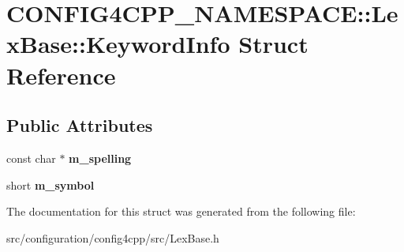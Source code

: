 \hypertarget{structCONFIG4CPP__NAMESPACE_1_1LexBase_1_1KeywordInfo}{\section{C\-O\-N\-F\-I\-G4\-C\-P\-P\-\_\-\-N\-A\-M\-E\-S\-P\-A\-C\-E\-:\-:Lex\-Base\-:\-:Keyword\-Info Struct Reference}
\label{structCONFIG4CPP__NAMESPACE_1_1LexBase_1_1KeywordInfo}
}
\subsection*{Public Attributes}
\begin{DoxyCompactItemize}
\item 
\hypertarget{structCONFIG4CPP__NAMESPACE_1_1LexBase_1_1KeywordInfo_aa7d6ecdf3e8f8ce57beabfc840af6160}{const char $\ast$ {\bfseries m\-\_\-spelling}}\label{structCONFIG4CPP__NAMESPACE_1_1LexBase_1_1KeywordInfo_aa7d6ecdf3e8f8ce57beabfc840af6160}

\item 
\hypertarget{structCONFIG4CPP__NAMESPACE_1_1LexBase_1_1KeywordInfo_af434462cd82af8113e512741d265b3f7}{short {\bfseries m\-\_\-symbol}}\label{structCONFIG4CPP__NAMESPACE_1_1LexBase_1_1KeywordInfo_af434462cd82af8113e512741d265b3f7}

\end{DoxyCompactItemize}


The documentation for this struct was generated from the following file\-:\begin{DoxyCompactItemize}
\item 
src/configuration/config4cpp/src/Lex\-Base.\-h\end{DoxyCompactItemize}
